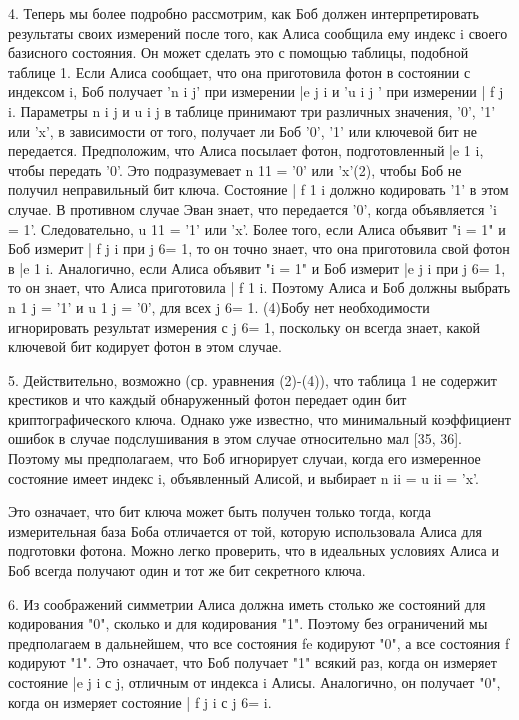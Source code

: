 4. Теперь мы более подробно рассмотрим, как Боб должен интерпретировать результаты своих измерений после того, как Алиса сообщила ему индекс i своего базисного состояния. Он может сделать это с помощью таблицы, подобной таблице 1. Если Алиса сообщает, что она приготовила фотон в состоянии с индексом i, Боб получает 'n i j' при измерении |e j i и 'u i j ' при измерении | f j i. Параметры n i j и u i j в таблице принимают три различных значения, '0', '1' или 'x', в зависимости от того, получает ли Боб '0', '1' или ключевой бит не передается.
Предположим, что Алиса посылает фотон, подготовленный |e 1 i, чтобы передать '0'. Это подразумевает n 11 = '0' или 'x'(2), чтобы Боб не получил неправильный бит ключа. Состояние | f 1 i должно кодировать '1' в этом случае. В противном случае Эван знает, что передается '0', когда объявляется 'i = 1'.
Следовательно, u 11 = '1' или 'x'. Более того, если Алиса объявит "i = 1" и Боб измерит | f j i при j 6= 1, то он точно знает, что она приготовила свой фотон в |e 1 i. Аналогично, если Алиса объявит "i = 1" и Боб измерит |e j i при j 6= 1, то он знает, что Алиса приготовила | f 1 i. Поэтому Алиса и Боб должны выбрать n 1 j = '1' и u 1 j = '0', для всех j 6= 1.
(4)Бобу нет необходимости игнорировать результат измерения с j 6= 1, поскольку он всегда знает, какой ключевой бит кодирует фотон в этом случае.

5. Действительно, возможно (ср. уравнения (2)-(4)), что таблица 1 не содержит крестиков и что каждый обнаруженный фотон передает один бит криптографического ключа. Однако уже известно, что минимальный коэффициент ошибок в случае подслушивания в этом случае относительно мал [35, 36]. Поэтому мы предполагаем, что Боб игнорирует случаи, когда его измеренное состояние имеет индекс i, объявленный Алисой, и выбирает n ii = u ii = 'x'.

Это означает, что бит ключа может быть получен только тогда, когда измерительная база Боба отличается от той, которую использовала Алиса для подготовки фотона. Можно легко проверить, что в идеальных условиях Алиса и Боб всегда получают один и тот же бит секретного ключа.

6. Из соображений симметрии Алиса должна иметь столько же состояний для кодирования "0", сколько и для кодирования "1". Поэтому без ограничений мы предполагаем в дальнейшем, что все состояния fe кодируют "0", а все состояния f кодируют "1". Это означает, что Боб получает "1" всякий раз, когда он измеряет состояние |e j i с j, отличным от индекса i Алисы. Аналогично, он получает "0", когда он измеряет состояние | f j i с j 6= i.

